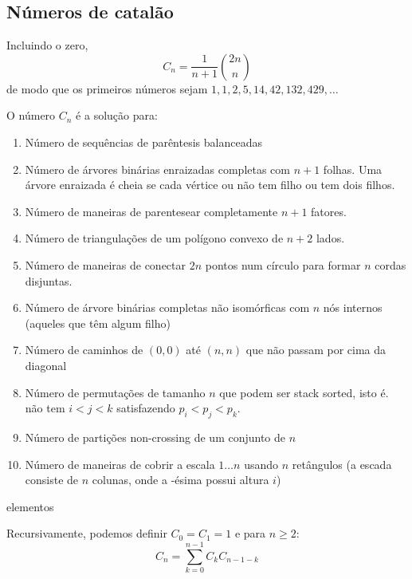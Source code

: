\subsection{Números de catalão}

Incluindo o zero, 
$$C_n = \dfrac{1}{n+1} {2n \choose n}$$
de modo que os primeiros números sejam $1, 1, 2, 5, 14, 42, 132, 429, \dots$

O número $C_n$ é a solução para:

\begin{enumerate}
    \item Número de sequências de parêntesis balanceadas
    \item Número de árvores binárias enraizadas completas com $n+1$ folhas. Uma árvore enraizada é cheia se cada vértice ou não tem filho ou tem dois filhos.
    \item Número de maneiras de parentesear completamente $n+1$ fatores.
    \item Número de triangulações de um polígono convexo de $n +2$ lados.
    \item Número de maneiras de conectar $2n$ pontos num círculo para formar $n$ cordas disjuntas.
    \item Número de árvore binárias completas não isomórficas com $n$ nós internos (aqueles que têm algum filho)
    \item Número de caminhos de $(0, 0)$ até $(n, n)$ que não passam por cima da diagonal
    \item Número de permutações de tamanho $n$ que podem ser stack sorted, isto é. não tem $i < j < k$ satisfazendo $p_i < p_j < p_k$.
    \item Número de partições non-crossing de um conjunto de $n$
    \item Número de maneiras de cobrir a escala $1 \dots n$ usando $n$ retângulos (a escada consiste de $n$ colunas, onde a -ésima possui altura $i$)
\end{enumerate} elementos

Recursivamente, podemos definir $C_0 = C_1 = 1$ e para $n \geq 2$:
$$ C_n = \sum\limits_{k=0}^{n-1} C_k C_{n-1-k}$$
